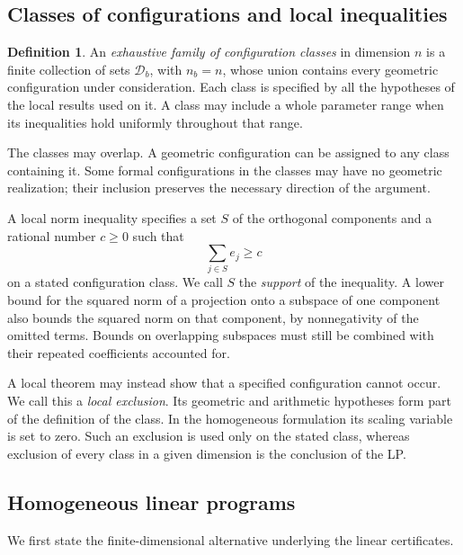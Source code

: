 \documentclass[11pt]{article}
\theoremstyle{definition}
\newtheorem{definition}[theorem]{Definition}
\theoremstyle{remark}
\numberwithin{equation}{section}
\begin{document}
\subsection{Classes of configurations and local inequalities}

\begin{definition}\label{def:configuration-family}
An \emph{exhaustive family of configuration classes} in dimension $n$
is a finite collection of sets $\mathcal D_b$, with $n_b=n$, whose
union contains every geometric configuration under consideration.
Each class is specified by all the hypotheses of the local results
used on it. A class may include a whole parameter range when its
inequalities hold uniformly throughout that range.
\end{definition}

The classes may overlap. A geometric configuration can be assigned
to any class containing it. Some formal configurations in the classes
may have no geometric realization; their inclusion preserves the
necessary direction of the argument.

A local norm inequality specifies a set $S$ of the orthogonal
components and a rational number $c\ge0$ such that
\begin{equation}\label{eq:supported-row}
                            \sum_{j\in S}e_j\ge c
\end{equation}
on a stated configuration class. We call $S$ the \emph{support} of
the inequality. A lower bound for the squared norm of a projection onto a subspace of one
component also bounds the squared norm on that component, by
nonnegativity of the omitted terms. Bounds on overlapping subspaces
must still be combined with their repeated coefficients accounted for.

A local theorem may instead show that a specified configuration
cannot occur. We call this a \emph{local exclusion}. Its geometric
and arithmetic hypotheses form part of the definition of the class.
In the homogeneous formulation its scaling variable is set to zero.
Such an exclusion is used only on the stated class, whereas exclusion
of every class in a given dimension is the conclusion of the LP.

\subsection{Homogeneous linear programs}

We first state the finite-dimensional alternative underlying the
linear certificates.
\end{document}
